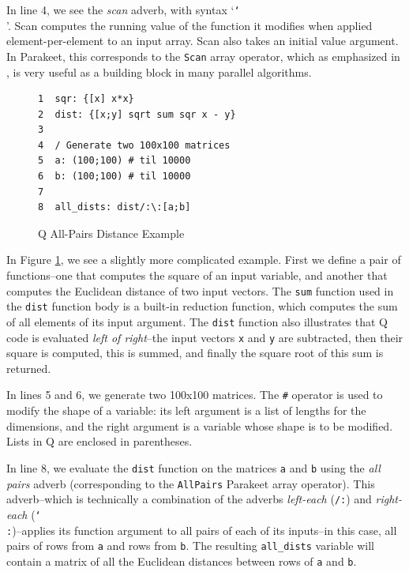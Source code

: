 \documentclass[preprint]{sigplanconf}
\begin{document}
In line 4, we see the \emph{scan} adverb, with syntax `\texttt{\char`\\}'.
Scan computes the running value of the function it modifies when applied
element-per-element to an input array. Scan also takes an initial value
argument.  In Parakeet, this corresponds to the \texttt{Scan} array operator,
which as emphasized in \cite{Blel90}, is very useful as a building block in many
parallel algorithms.

\begin{figure}
\begin{verbatim}
1  sqr: {[x] x*x}
2  dist: {[x;y] sqrt sum sqr x - y}
3
4  / Generate two 100x100 matrices
5  a: (100;100) # til 10000
6  b: (100;100) # til 10000
7
8  all_dists: dist/:\:[a;b]
\end{verbatim}
\caption{Q All-Pairs Distance Example}
\label{QAllPairsDist}
\end{figure}

In Figure \ref{QAllPairsDist}, we see a slightly more complicated example.
First we define a pair of functions--one that computes the square of an input
variable, and another that computes the Euclidean distance of two input
vectors.  The \texttt{sum} function used in the \texttt{dist} function body is a
built-in reduction function, which computes the sum of all elements of its input
argument.  The \texttt{dist} function also illustrates that Q code is evaluated
\emph{left of right}--the input vectors \texttt{x} and \texttt{y} are
subtracted, then their square is computed, this is summed, and finally the
square root of this sum is returned.

In lines 5 and 6, we generate two 100x100 matrices.  The \texttt{\#} operator is
used to modify the shape of a variable: its left argument is a list of lengths
for the dimensions, and the right argument is a variable whose shape is to be
modified.  Lists in Q are enclosed in parentheses.

In line 8, we evaluate the \texttt{dist} function on the matrices \texttt{a} and
\texttt{b} using the {\it all pairs} adverb (corresponding to the
\texttt{AllPairs} Parakeet array operator).  This adverb--which is technically
a combination of the adverbs \emph{left-each} (\texttt{/:}) and
\emph{right-each} (\texttt{\char`\\:})--applies its function argument to all
pairs of each of its inputs--in this case, all pairs of rows from \texttt{a} and
rows from \texttt{b}.  The resulting \texttt{all\_dists} variable will contain a
matrix of all the Euclidean distances between rows of \texttt{a} and \texttt{b}.
\end{document}
